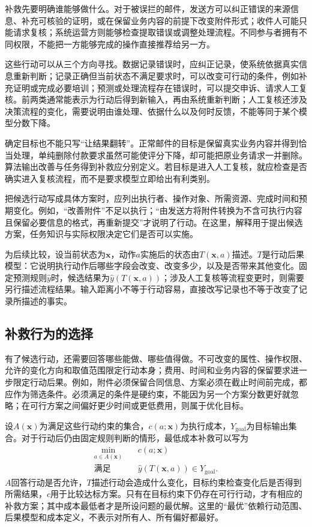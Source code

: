 补救先要明确谁能够做什么。对于被误拦的邮件，发送方可以纠正错误的来源信息、补充可核验的证明，或在保留业务内容的前提下改变附件形式；收件人可能只能请求复核；系统运营方则能够检查提取错误或调整处理流程。不同参与者拥有不同权限，不能把一方能够完成的操作直接推荐给另一方。

这些行动可以从三个方向寻找。数据记录错误时，应纠正记录，使系统依据真实信息重新判断；记录正确但当前状态不满足要求时，可以改变可行动的条件，例如补充证明或完成必要培训；预测或处理流程存在错误时，可以提交申诉、请求人工复核。前两类通常能表示为行动后得到新输入，再由系统重新判断；人工复核还涉及决策流程的变化，需要说明由谁处理、依据什么以及何时反馈，不能等同于某个模型分数下降。

确定目标也不能只写“让结果翻转”。正常邮件的目标是保留真实业务内容并得到恰当处理，单纯删除付款要求虽然可能使评分下降，却可能把原业务请求一并删除。算法输出改善与任务得到补救应分别定义。若目标是进入人工复核，就应检查是否确实进入复核流程，而不是要求模型立即给出有利类别。

把候选行动写成具体方案时，应列出执行者、操作对象、所需资源、完成时间和预期变化。例如，“改善附件”不足以执行；“由发送方将附件转换为不含可执行内容且保留必要信息的格式，再重新提交”才说明了行动。在这里，解释用于提出候选方案，任务知识与实际权限决定它们是否可以实施。

为后续比较，设当前状态为$\bm{x}$，动作$a$实施后的状态由$T(\bm{x},a)$描述。$T$是行动后果模型：它说明执行动作后哪些字段会改变、改变多少，以及是否带来其他变化。固定预测规则$\hat y$时，候选结果为$\hat y(T(\bm{x},a))$；涉及人工复核等流程变更时，则需要另行描述流程结果。输入距离小不等于行动容易，直接改写记录也不等于改变了记录所描述的事实。

\subsection{补救行为的选择}
\label{sec:interpretability-recourse-action}

有了候选行动，还需要回答哪些能做、哪些值得做。不可改变的属性、操作权限、允许的变化方向和取值范围限定行动本身；费用、时间和业务内容的保留要求进一步限定行动后果。例如，附件必须保留合同信息、方案必须在截止时间前完成，都应作为筛选条件。必须满足的条件是硬约束，不能因为另一个方案分数更好就忽略；在可行方案之间偏好更少时间或更低费用，则属于优化目标。

设$A(\bm{x})$为满足这些行动约束的集合，$c(a;\bm{x})$为执行成本，$Y_{\mathrm{goal}}$为目标输出集合。对于行动后仍由固定规则判断的情形，最低成本补救可以写为
\begin{equation}
 \begin{aligned}
 \min_{a\in A(\bm{x})}\quad &c(a;\bm{x})\\
 \text{满足}\quad &\hat y(T(\bm{x},a))\in Y_{\mathrm{goal}}.
 \end{aligned}
 \label{eq:interpretability-recourse}
\end{equation}
$A$回答行动是否允许，$T$描述行动会造成什么变化，目标约束检查变化后是否得到所需结果，$c$用于比较达标方案。只有在目标约束下仍存在可行行动，才有相应的补救方案；其中成本最低者才是所设问题的最优解。这里的“最优”依赖行动范围、后果模型和成本定义，不表示对所有人、所有偏好都最好。

